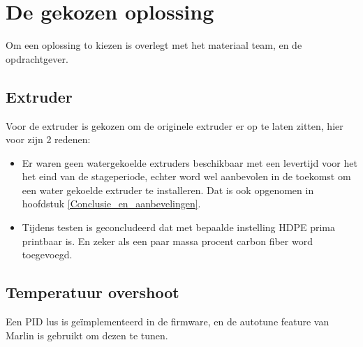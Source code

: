 \chapter{De gekozen oplossing}
\label{De_gekozen_oplossing}

Om een oplossing to kiezen is overlegt met het materiaal team, en de
opdrachtgever.

\section{Extruder}

Voor de extruder is gekozen om de originele extruder er op te laten zitten,
hier voor zijn 2 redenen:

\begin{itemize}
    \item Er waren geen watergekoelde extruders beschikbaar met een levertijd
    voor het het eind van de stageperiode, echter word wel aanbevolen in de
    toekomst om een water gekoelde extruder te installeren. Dat is ook
    opgenomen in hoofdstuk \ref{Conclusie_en_aanbevelingen}.
    \item Tijdens testen is geconcludeerd dat met bepaalde instelling HDPE
    prima printbaar is. En zeker als een paar massa procent carbon fiber word
    toegevoegd.
\end{itemize}

\section{Temperatuur overshoot}

Een PID lus is geïmplementeerd in de firmware, en de autotune feature van
Marlin is gebruikt om dezen te tunen.

